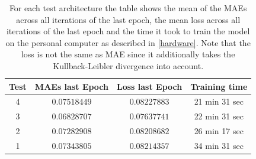\begin{center}
    \begin{table}[H]
        \centering
        \begin{tabular}{ | c | c | c | c | }
            \hline
            Test &MAEs last Epoch & Loss last Epoch & Training time\\ \hline
            4 & $0.07518449$  & $0.08227883$  & 21 min 31 sec  \\
            3 & $0.06828707$  & $0.07637741$  & 22 min 31 sec  \\
            2 & $0.07282908$  & $0.08208682$  & 26 min 17 sec  \\  
            1 & $0.07343805$  & $0.08214357$  & 34 min 31 sec  \\  
            \hline
        \end{tabular} 
        \caption{For each test architecture the table shows the mean of the MAEs across all iterations of the last
        epoch, the mean loss across all iterations of the last epoch and the time it took to train the model
        on the personal computer as described in \autoref{hardware}. Note that the loss is not the same
        as MAE since it additionally takes the Kullback-Leibler divergence into account.} \label{table_maes2}
    \end{table} 
\end{center}

